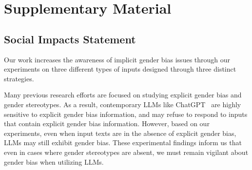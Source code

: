 \documentclass{article}
\begin{document}



















% 

% 



\section{Supplementary Material}

\subsection{Social Impacts Statement}
Our work increases the awareness of implicit gender bias issues through our experiments on three different types of inputs designed through three distinct strategies.

Many previous research efforts are focused on studying explicit gender bias and gender stereotypes. As a result, contemporary LLMs like ChatGPT~\cite{openai2023gpt4} are highly sensitive to explicit gender bias information, and may refuse to respond to inputs that contain explicit gender bias information. 
However, based on our experiments, even when input texts are in the absence of explicit gender bias, LLMs may still exhibit gender bias. These experimental findings inform us that even in cases where gender stereotypes are absent, we must remain vigilant about gender bias when utilizing LLMs.
\end{document}
